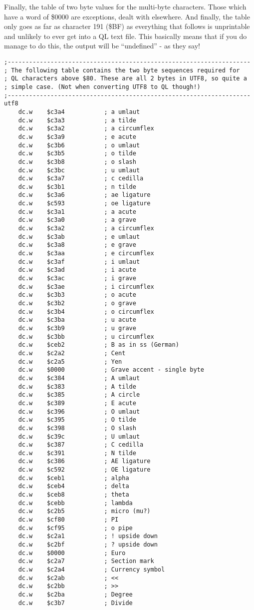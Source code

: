 Finally, the table of two byte values for the multi-byte characters.
Those which have a word of \$0000 are exceptions, dealt with elsewhere.
And finally, the table only goes as far as character 191 (\$BF) as
everything that follows is unprintable and unlikely to ever get into
a QL text file. This basically means that if you do manage to do this,
the output will be ``undefined'' - as they say!

\begin{lstlisting}[firstnumber=last,caption={Ql2utf8: The UTF8 ``two byte'' character table}]
;--------------------------------------------------------------------
; The following table contains the two byte sequences required for 
; QL characters above $80. These are all 2 bytes in UTF8, so quite a 
; simple case. (Not when converting UTF8 to QL though!)
;--------------------------------------------------------------------
utf8
    dc.w    $c3a4           ; a umlaut
    dc.w    $c3a3           ; a tilde
    dc.w    $c3a2           ; a circumflex
    dc.w    $c3a9           ; e acute
    dc.w    $c3b6           ; o umlaut
    dc.w    $c3b5           ; o tilde
    dc.w    $c3b8           ; o slash
    dc.w    $c3bc           ; u umlaut
    dc.w    $c3a7           ; c cedilla
    dc.w    $c3b1           ; n tilde
    dc.w    $c3a6           ; ae ligature
    dc.w    $c593           ; oe ligature
    dc.w    $c3a1           ; a acute
    dc.w    $c3a0           ; a grave
    dc.w    $c3a2           ; a circumflex
    dc.w    $c3ab           ; e umlaut
    dc.w    $c3a8           ; e grave
    dc.w    $c3aa           ; e circumflex
    dc.w    $c3af           ; i umlaut
    dc.w    $c3ad           ; i acute
    dc.w    $c3ac           ; i grave
    dc.w    $c3ae           ; i circumflex
    dc.w    $c3b3           ; o acute
    dc.w    $c3b2           ; o grave
    dc.w    $c3b4           ; o circumflex
    dc.w    $c3ba           ; u acute
    dc.w    $c3b9           ; u grave
    dc.w    $c3bb           ; u circumflex
    dc.w    $ceb2           ; B as in ss (German)
    dc.w    $c2a2           ; Cent
    dc.w    $c2a5           ; Yen
    dc.w    $0000           ; Grave accent - single byte
    dc.w    $c384           ; A umlaut
    dc.w    $c383           ; A tilde
    dc.w    $c385           ; A circle
    dc.w    $c389           ; E acute
    dc.w    $c396           ; O umlaut
    dc.w    $c395           ; O tilde
    dc.w    $c398           ; O slash
    dc.w    $c39c           ; U umlaut
    dc.w    $c387           ; C cedilla
    dc.w    $c391           ; N tilde
    dc.w    $c386           ; AE ligature
    dc.w    $c592           ; OE ligature
    dc.w    $ceb1           ; alpha
    dc.w    $ceb4           ; delta
    dc.w    $ceb8           ; theta
    dc.w    $cebb           ; lambda
    dc.w    $c2b5           ; micro (mu?)
    dc.w    $cf80           ; PI
    dc.w    $cf95           ; o pipe
    dc.w    $c2a1           ; ! upside down
    dc.w    $c2bf           ; ? upside down
    dc.w    $0000           ; Euro
    dc.w    $c2a7           ; Section mark
    dc.w    $c2a4           ; Currency symbol
    dc.w    $c2ab           ; <<
    dc.w    $c2bb           ; >>
    dc.w    $c2ba           ; Degree
    dc.w    $c3b7           ; Divide
\end{lstlisting}

